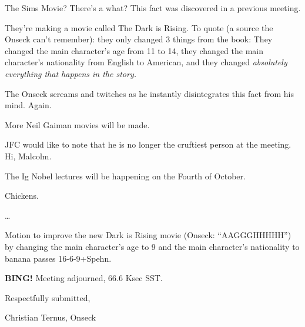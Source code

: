 \documentclass[10pt]{article}
\newcommand{\bing}{{\bf BING!} }
\begin{document}
The Sims Movie?  There's a what?  This fact was discovered in a previous meeting.

They're making a movie called The Dark is Rising.  To quote (a source the Onseck can't remember): they only changed 3 things from the book:  They changed the main character's age from 11 to 14, they changed the main character's nationality from English to American, and they changed \emph{absolutely everything that happens in the story.}

The Onseck screams and twitches as he instantly disintegrates this fact from his mind.  Again.

More Neil Gaiman movies will be made.

JFC would like to note that he is no longer the cruftiest person at the meeting.  Hi, Malcolm.

The Ig Nobel lectures will be happening on the Fourth of October.

Chickens.

\ldots{}

Motion to improve the new Dark is Rising movie (Onseck: ``AAGGGHHHHH'') by changing the main character's age to 9 and the main character's nationality to banana passes 16-6-9+Spehn.

\bing
\noindent
Meeting adjourned, 66.6 Ksec SST.

\vspace{18pt}

\centerline{Respectfully submitted,}
\centerline{Christian Ternus, Onseck}
\end{document}
